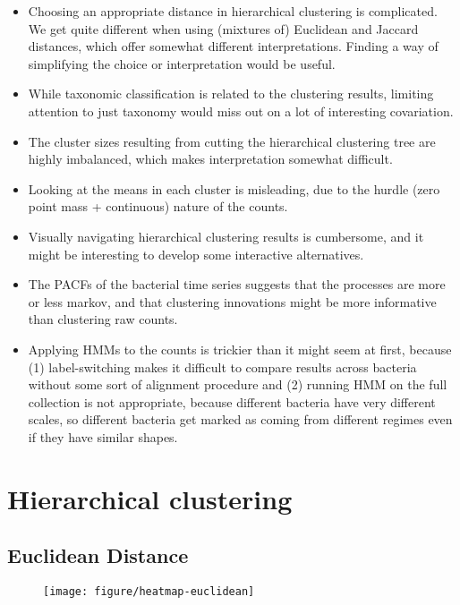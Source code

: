 \documentclass{article}
\begin{document}
\begin{itemize}
\item Choosing an appropriate distance in hierarchical clustering is
  complicated. We get quite different when using (mixtures of) Euclidean and
  Jaccard distances, which offer somewhat different interpretations. Finding a
  way of simplifying the choice or interpretation would be useful.
\item While taxonomic classification is related to the clustering results,
  limiting attention to just taxonomy would miss out on a lot of interesting
  covariation.
\item The cluster sizes resulting from cutting the hierarchical clustering tree
  are highly imbalanced, which makes interpretation somewhat difficult.
\item Looking at the means in each cluster is misleading, due to the hurdle
  (zero point mass + continuous) nature of the counts.
\item Visually navigating hierarchical clustering results is cumbersome, and it
  might be interesting to develop some interactive alternatives.
\item The PACFs of the bacterial time series suggests that the processes are
  more or less markov, and that clustering innovations might be more informative
  than clustering raw counts.
\item Applying HMMs to the counts is trickier than it might seem at first,
  because (1) label-switching makes it difficult to compare results across
  bacteria without some sort of alignment procedure and (2) running HMM on the
  full collection is not appropriate, because different bacteria have very
  different scales, so different bacteria get marked as coming from different
  regimes even if they have similar shapes.
\end{itemize}

\section{Hierarchical clustering}

\subsection{Euclidean Distance}

\begin{figure}[ht]
  \centering
  \texttt{[image: figure/heatmap-euclidean]}
  \caption{\label{fig:heatmap-euclidean} }
\end{figure}
\end{document}
